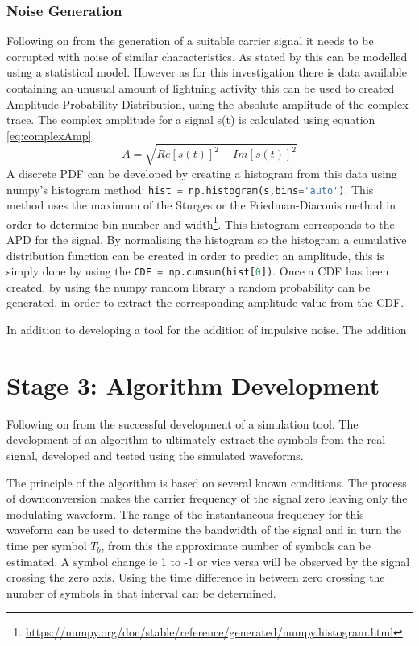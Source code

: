 \subsubsection{Noise Generation}
Following on from the generation of a suitable carrier signal it needs to be corrupted with noise of similar characteristics. As stated by \cite{Chrissan2000} this can be modelled using a statistical model. However as for this investigation there is data available containing an unusual amount of lightning activity this can be used to created Amplitude Probability Distribution, using the absolute amplitude of the complex trace. The complex amplitude for a signal s(t) is calculated using equation \ref{eq:complexAmp}. 
\begin{equation}
    A = \sqrt{Re[s(t)]^2 + Im[s(t)]^2}
    \label{eq:complexAmp}
\end{equation}
A discrete PDF can be developed by creating a histogram from this data using numpy's histogram method: \lstinline[language=python]{hist = np.histogram(s,bins='auto')}. This method uses the maximum of the Sturges or the Friedman-Diaconis method in order to determine bin number and width\footnote{\hyperlink{https://numpy.org/doc/stable/reference/generated/numpy.histogram.html}{https://numpy.org/doc/stable/reference/generated/numpy.histogram.html}}.
This histogram corresponds to the APD for the signal. By normalising the histogram so the histogram a cumulative distribution function can be created in order to predict an amplitude, this is simply done by using the \lstinline[language=python]{CDF = np.cumsum(hist[0])}. Once a CDF has been created, by using the numpy random library a random probability can be generated, in order to extract the corresponding amplitude value from the CDF.

In addition to developing a tool for the addition of impulsive noise. The addition 
\section{Stage 3: Algorithm Development}
Following on from the successful development of a simulation tool. The development of an algorithm to ultimately extract the symbols from the real signal, developed and tested using the simulated waveforms.

The principle of the algorithm is based on several known conditions. The process of downconversion makes the carrier frequency of the signal zero leaving only the modulating waveform. The range of the instantaneous frequency for this waveform can be used to determine the bandwidth of the signal and in turn the time per symbol $T_b$, from this the approximate number of symbols can be estimated. A symbol change ie 1 to -1 or vice versa will be observed by the signal crossing the zero axis. Using the time difference in between zero crossing the number of symbols in that interval can be determined.

